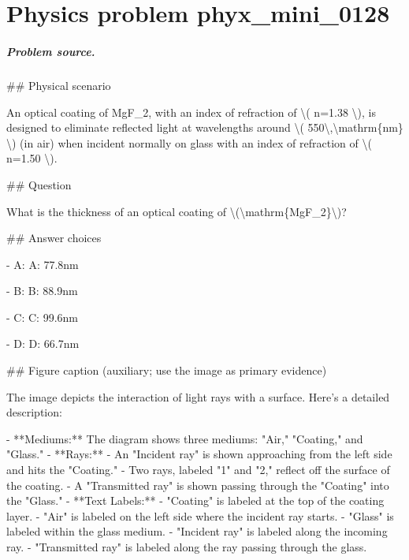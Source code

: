 
\chapter{Physics problem phyx\_mini\_0128}
\label{ch:PhyXMiniProblems_problem_phyx_mini_0128}

\paragraph{Problem source.}
\#\# Physical scenario

An optical coating of MgF\_2, with an index of refraction of \textbackslash{}( n=1.38 \textbackslash{}), is designed to eliminate reflected light at wavelengths around \textbackslash{}( 550\textbackslash{},\textbackslash{}mathrm\{nm\} \textbackslash{}) (in air) when incident normally on glass with an index of refraction of \textbackslash{}( n=1.50 \textbackslash{}).

\#\# Question

What is the thickness of an optical coating of \textbackslash{}(\textbackslash{}mathrm\{MgF\_2\}\textbackslash{})?

\#\# Answer choices

- A: A: 77.8nm

- B: B: 88.9nm

- C: C: 99.6nm

- D: D: 66.7nm

\#\# Figure caption (auxiliary; use the image as primary evidence)

The image depicts the interaction of light rays with a surface. Here's a detailed description:

- **Mediums:** The diagram shows three mediums: "Air," "Coating," and "Glass."
- **Rays:** 
  - An "Incident ray" is shown approaching from the left side and hits the "Coating."
  - Two rays, labeled "1" and "2," reflect off the surface of the coating.
  - A "Transmitted ray" is shown passing through the "Coating" into the "Glass."
- **Text Labels:** 
  - "Coating" is labeled at the top of the coating layer.
  - "Air" is labeled on the left side where the incident ray starts.
  - "Glass" is labeled within the glass medium.
  - "Incident ray" is labeled along the incoming ray.
  - "Transmitted ray" is labeled along the ray passing through the glass.

